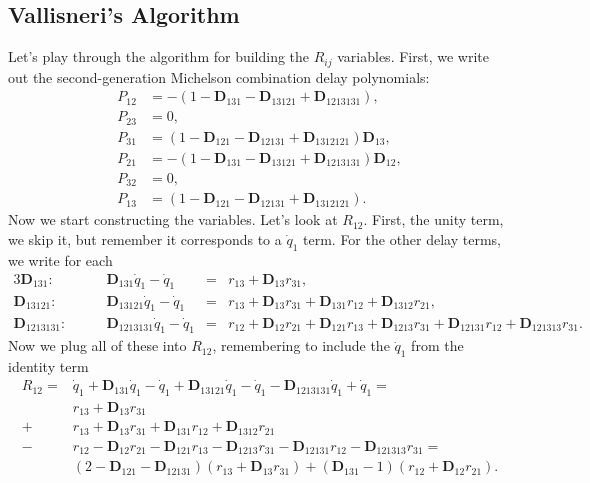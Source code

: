 \documentclass[11pt]{article}
\begin{document}
\subsection{Vallisneri's Algorithm}
Let's play through the algorithm for building the $R_{ij}$ variables. First, we write out the second-generation Michelson combination delay polynomials:
\begin{subequations}\label{eq:Pij_X2}
\begin{align*}
P_{12} &= -\left(1-\mathbf{D}_{131}-\mathbf{D}_{13121}+\mathbf{D}_{1213131}\right),\\
P_{23} &= 0,\\
P_{31} &= \left(1-\mathbf{D}_{121}-\mathbf{D}_{12131}+\mathbf{D}_{1312121}\right)\mathbf{D}_{13}, \\
P_{21} &= -\left(1-\mathbf{D}_{131}-\mathbf{D}_{13121}+\mathbf{D}_{1213131}\right)\mathbf{D}_{12}, \\
P_{32} &= 0, \\
P_{13} &= \left(1-\mathbf{D}_{121}-\mathbf{D}_{12131}+\mathbf{D}_{1312121}\right).
\end{align*}
\end{subequations}
Now we start constructing the variables. Let's look at $R_{12}$. First, the unity term, we skip it, but remember it corresponds to a $\dot q_1$ term. For the other delay terms, we write for each
\begin{alignat*}{3}
    \mathbf{D}_{131}: \qquad
    & \mathbf{D}_{131}\dot q_1 - \dot q_1
    & {}={}& r_{13} + \mathbf{D}_{13} r_{31}, \\[3pt]
    \mathbf{D}_{13121}: \qquad
    & \mathbf{D}_{13121}\dot q_1 - \dot q_1
    & {}={}& r_{13} + \mathbf{D}_{13} r_{31}
            + \mathbf{D}_{131} r_{12}
            + \mathbf{D}_{1312} r_{21}, \\[3pt]
    \mathbf{D}_{1213131}: \qquad
    & \mathbf{D}_{1213131}\dot q_1 - \dot q_1
    & {}={}& r_{12} + \mathbf{D}_{12} r_{21}
            + \mathbf{D}_{121} r_{13}
            + \mathbf{D}_{1213} r_{31}
            + \mathbf{D}_{12131} r_{12}
            + \mathbf{D}_{121313} r_{31}.
\end{alignat*}
Now we plug all of these into $R_{12}$, remembering to include the $\dot q_1$ from the identity term
\begin{align*}
    R_{12}= &\dot q_1+\mathbf{D}_{131}\dot q_1 - \dot q_1+\mathbf{D}_{13121}\dot q_1 - \dot q_1-\mathbf{D}_{1213131}\dot q_1 + \dot q_1=\\
     &r_{13} + \mathbf{D}_{13} r_{31} \\
     +&r_{13} + \mathbf{D}_{13} r_{31} + \mathbf{D}_{131} r_{12} + \mathbf{D}_{1312} r_{21}
     \\-&r_{12} - \mathbf{D}_{12} r_{21} - \mathbf{D}_{121} r_{13} - \mathbf{D}_{1213} r_{31} - \mathbf{D}_{12131} r_{12} - \mathbf{D}_{121313} r_{31}=\\
     &\left(2-\mathbf{D}_{121}-\mathbf{D}_{12131}\right)\left(r_{13}+\mathbf{D}_{13} r_{31}\right)+\left(\mathbf{D}_{131}-1\right)\left( r_{12}+\mathbf{D}_{12} r_{21}\right).
\end{align*}
\end{document}
